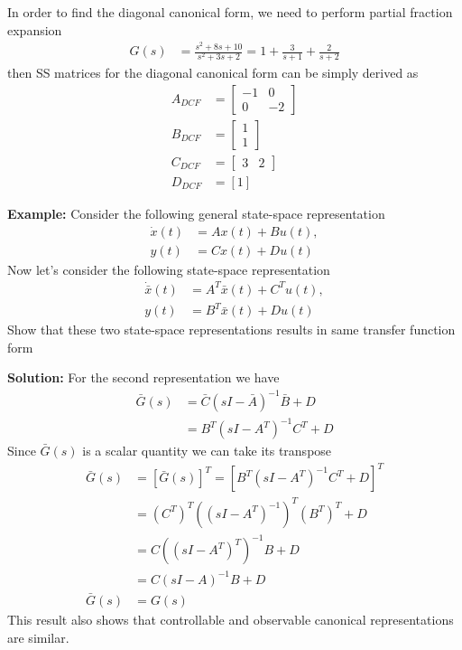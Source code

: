 \documentclass[twoside]{article}
\begin{document}
%
In order to find the diagonal canonical form, we need to perform partial fraction
expansion 
%
\begin{align*}
G(s) &= \frac{s^2 + 8 s + 10}{s^2 + 3 s + 2}
	= 1 + \frac{3}{s+1} + \frac{2}{s+2}
\end{align*}
%
then SS matrices for the diagonal canonical form can be simply derived as
%
\begin{align*}
	A_{DCF} &=  \left[ \begin{array}{cc} -1 & 0  \\  0 & -2 \end{array} \right]
		\\
	B_{DCF} &=  \left[ \begin{array}{c} 1  \\  1 \end{array} \right]
		\\
	C_{DCF} &= \left[ \begin{array}{cc} 3  &  2 \end{array} \right]
	\\
	 D_{DCF} &=  [1]
\end{align*}

\newpage

\textbf{Example:} Consider the following general
state-space representation
%
\begin{align*}
  \dot{x}(t) &= A x(t) + B u(t) , \\
  y(t) &= C x(t) + D u(t) 
\end{align*}
%
Now let's consider the following
state-space representation
%
\begin{align*}
  \dot{\bar{x}}(t) &= A^T \bar{x}(t) + C^T u(t) , \\
  y(t) &= B^T \bar{x}(t) + D u(t) 
\end{align*}
%
Show that these two state-space representations 
results in same transfer function form

\vspace{6pt}

\textbf{Solution:} 
%
For the second representation we have 
%
\begin{align*}
\bar{G}(s) &= \bar{C} \left( s I - \bar{A} \right)^{-1} \bar{B} + D
	\\
	&= B^T \left( s I - A^T \right)^{-1} C^T + D
\end{align*}
%
Since $\bar{G}(s)$ is a scalar quantity we can take its
transpose 
%
\begin{align*}
	\bar{G}(s) &= [\bar{G}(s)]^T = 
	[ B^T \left( s I - A^T \right)^{-1} C^T + D ]^T
	\\
	&= (C^T)^T \left( \left( s I - A^T \right)^{-1} \right)^T (B^T)^T + D
	\\
	&= C \left( \left( s I - A^T \right)^T \right)^{-1} B + D
	\\
	&= C \left( s I - A \right)^{-1} B + D
	\\
	\bar{G}(s) &= G(s)
\end{align*}
%
This result also shows that controllable and observable 
canonical representations are similar. 
\end{document}
